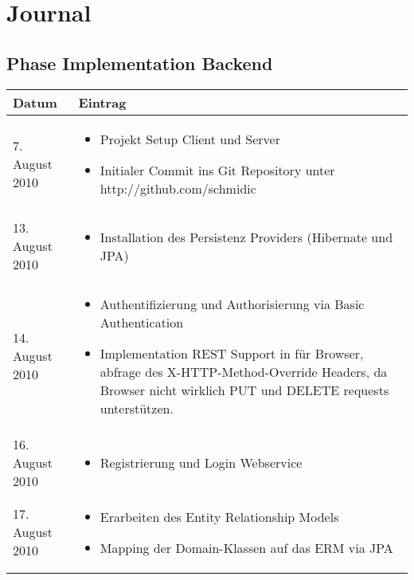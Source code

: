 \chapter{Journal}


\section{Phase Implementation Backend}
\begin{spacing}{0.5}
  \begin{longtable}{|p{4cm}|p{10cm}|}
\hline
  Datum & Eintrag\\
  \hline
  7. August 2010 & 
  \begin{itemize}
  \item Projekt Setup Client und Server 
  \item Initialer Commit ins Git Repository unter http://github.com/schmidic
  \end{itemize}\\
  \hline

  13. August 2010 & 
  \begin{itemize}
  \item Installation des Persistenz Providers (Hibernate und JPA)
  \end{itemize}\\
  \hline
  
  14. August 2010 & 
  \begin{itemize}
  \item Authentifizierung und Authorisierung via Basic Authentication
  \item Implementation REST Support in f\"ur Browser, abfrage des X-HTTP-Method-Override Headers, da Browser nicht wirklich PUT und DELETE requests unterst\"utzen.
  \end{itemize}\\
  \hline
  
  16. August 2010 & 
  \begin{itemize}
  \item Registrierung und Login Webservice
  \end{itemize}\\
  \hline

  17. August 2010 & 
  \begin{itemize}
  \item Erarbeiten des Entity Relationship Models
  \item Mapping der Domain-Klassen auf das ERM via JPA
  \end{itemize}\\
  \hline
  

\end{longtable}
\end{spacing}

